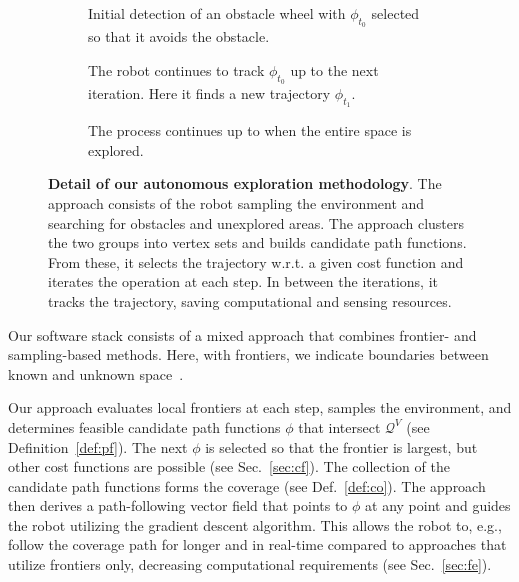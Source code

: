 \documentclass[letterpaper,10pt,conference,twoside]{IEEEtran}
\theoremstyle{definition}
\begin{document}
\begin{figure*}
  \begin{subfigure}[m]{0.33\textwidth}
    \centering
    
    \caption{Initial detection of an obstacle wheel with $\phi_{t_0}$ selected so that it avoids the obstacle.}
    \label{fig:3-1}
  \end{subfigure}
  \hfill
  \begin{subfigure}[m]{0.32\textwidth}
    \centering
    \hspace*{-.15cm}
    
    \caption{The robot continues to track $\phi_{t_0}$ up to the next iteration. Here it finds a new trajectory $\phi_{t_1}$.}
    \label{fig:3-2}
  \end{subfigure}
  \begin{subfigure}[m]{0.33\textwidth}
    \centering
    \hspace*{.05cm}
    
    \caption{The process continues up to when the entire space is explored.}
    \label{fig:3-3}
  \end{subfigure}
  \caption[Detail of our autonomous exploration methodology]{\textbf{Detail of our autonomous exploration methodology}. The %
  approach consists of the robot sampling the environment and searching for obstacles and unexplored areas. The %
  approach clusters the two groups into vertex sets and builds candidate path functions. From these, it selects the %
  trajectory w.r.t. a given cost function and iterates the operation at each step. In between the iterations, it tracks the trajectory, saving computational and sensing resources.}
  \label{fig:3}
\end{figure*}
\noindent
Our software stack %
consists of a mixed approach that combines frontier- and sampling-based methods. 
Here, with frontiers, we indicate %
boundaries between known and unknown space~\cite{%
placed2022survey,dang2019graph}.
%

Our 
approach evaluates local frontiers at each step, samples the environment, and determines feasible candidate path functions $\phi$ that intersect $\mathcal{Q}^V$ (see Definition~\ref{def:pf}).
The next $\phi$ is selected so that the frontier is largest, but other cost functions are possible (see Sec.~\ref{sec:cf}). The collection of the candidate path functions forms the coverage (see Def.~\ref{def:co}).
The %
approach then derives a path-following vector field that points to $\phi$ at any point and guides the robot utilizing the gradient descent algorithm. This allows the robot to, e.g., follow the coverage path for longer and in real-time compared to approaches that utilize frontiers only, decreasing computational requirements (see Sec.~\ref{sec:fe}).
\end{document}
